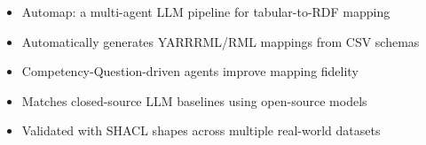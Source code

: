 \documentclass{article}
\begin{document}
\begin{itemize}
\item Automap: a multi-agent LLM pipeline for tabular-to-RDF mapping
\item Automatically generates YARRRML/RML mappings from CSV schemas
\item Competency-Question-driven agents improve mapping fidelity
\item Matches closed-source LLM baselines using open-source models
\item Validated with SHACL shapes across multiple real-world datasets
\end{itemize}
\end{document}
